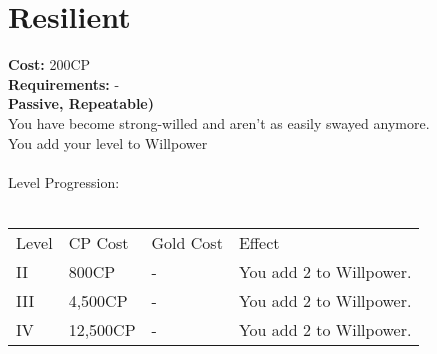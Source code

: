\section{Resilient}\label{perk:resilient}
\textbf{Cost:} 200CP\\
\textbf{Requirements:} -\\
\textbf{Passive, Repeatable)}\\
You have become strong-willed and aren't as easily swayed anymore.\\
You add your level to Willpower\\
\\
Level Progression:\\
\\
\begin{tabular}{l | l | l | l}
	Level & CP Cost & Gold Cost & Effect\\
	II & 800CP & - & You add 2 to Willpower.\\
	III & 4,500CP & - & You add 2 to Willpower.\\
	IV & 12,500CP & - & You add 2 to Willpower.\\
\end{tabular}
